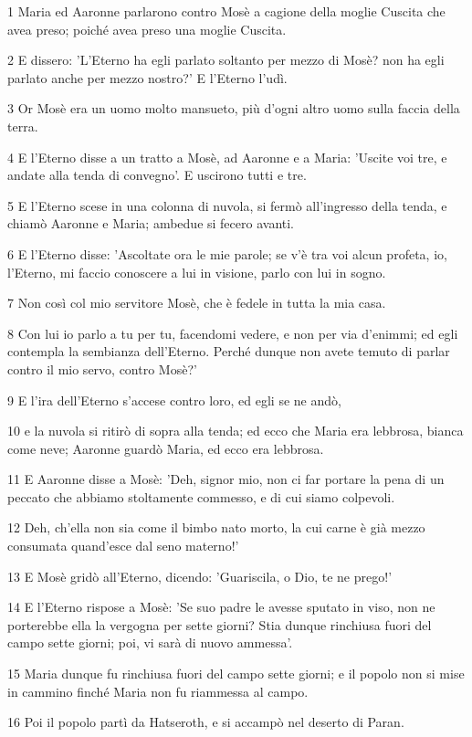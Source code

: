 \par 1 Maria ed Aaronne parlarono contro Mosè a cagione della moglie Cuscita che avea preso; poiché avea preso una moglie Cuscita.
\par 2 E dissero: 'L'Eterno ha egli parlato soltanto per mezzo di Mosè? non ha egli parlato anche per mezzo nostro?' E l'Eterno l'udì.
\par 3 Or Mosè era un uomo molto mansueto, più d'ogni altro uomo sulla faccia della terra.
\par 4 E l'Eterno disse a un tratto a Mosè, ad Aaronne e a Maria: 'Uscite voi tre, e andate alla tenda di convegno'. E uscirono tutti e tre.
\par 5 E l'Eterno scese in una colonna di nuvola, si fermò all'ingresso della tenda, e chiamò Aaronne e Maria; ambedue si fecero avanti.
\par 6 E l'Eterno disse: 'Ascoltate ora le mie parole; se v'è tra voi alcun profeta, io, l'Eterno, mi faccio conoscere a lui in visione, parlo con lui in sogno.
\par 7 Non così col mio servitore Mosè, che è fedele in tutta la mia casa.
\par 8 Con lui io parlo a tu per tu, facendomi vedere, e non per via d'enimmi; ed egli contempla la sembianza dell'Eterno. Perché dunque non avete temuto di parlar contro il mio servo, contro Mosè?'
\par 9 E l'ira dell'Eterno s'accese contro loro, ed egli se ne andò,
\par 10 e la nuvola si ritirò di sopra alla tenda; ed ecco che Maria era lebbrosa, bianca come neve; Aaronne guardò Maria, ed ecco era lebbrosa.
\par 11 E Aaronne disse a Mosè: 'Deh, signor mio, non ci far portare la pena di un peccato che abbiamo stoltamente commesso, e di cui siamo colpevoli.
\par 12 Deh, ch'ella non sia come il bimbo nato morto, la cui carne è già mezzo consumata quand'esce dal seno materno!'
\par 13 E Mosè gridò all'Eterno, dicendo: 'Guariscila, o Dio, te ne prego!'
\par 14 E l'Eterno rispose a Mosè: 'Se suo padre le avesse sputato in viso, non ne porterebbe ella la vergogna per sette giorni? Stia dunque rinchiusa fuori del campo sette giorni; poi, vi sarà di nuovo ammessa'.
\par 15 Maria dunque fu rinchiusa fuori del campo sette giorni; e il popolo non si mise in cammino finché Maria non fu riammessa al campo.
\par 16 Poi il popolo partì da Hatseroth, e si accampò nel deserto di Paran.

